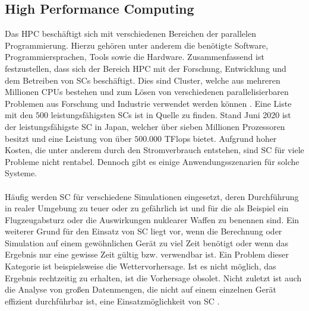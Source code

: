 \subsection{High Performance Computing}
Das \ac{HPC} beschäftigt sich mit verschiedenen Bereichen der parallelen Programmierung. Hierzu gehören unter anderem die benötigte Software, Programmiersprachen, Tools sowie die Hardware. Zusammenfassend ist festzustellen, dass sich der Bereich \ac{HPC} mit der Forschung, Entwicklung und dem Betreiben von \acp{SC} beschäftigt. Dies sind Cluster, welche aus mehreren Millionen \acp{CPU} bestehen und zum Lösen von verschiedenen parallelisierbaren Problemen aus Forschung und Industrie verwendet werden können \cite{nielsen2016introduction}. Eine Liste mit den $500$ leistungsfähigsten \acp{SC} ist in Quelle \cite{top500} zu finden. Stand Juni 2020 ist der leistungsfähigste \ac{SC} in Japan, welcher über sieben Millionen Prozessoren besitzt und eine Leistung von über $500.000$ TFlops bietet. Aufgrund hoher Kosten, die unter anderem durch den Stromverbrauch entstehen, sind \ac{SC} für viele Probleme nicht rentabel. Dennoch gibt es einige Anwendungsszenarien für solche Systeme.
\\\\
Häufig werden \ac{SC} für verschiedene Simulationen eingesetzt, deren Durchführung in realer Umgebung zu teuer oder zu gefährlich ist und für die als Beispiel ein Flugzeugabsturz oder die Auswirkungen nuklearer Waffen zu benennen sind. Ein weiterer Grund für den Einsatz von SC liegt vor, wenn die Berechnung oder Simulation auf einem gewöhnlichen Gerät zu viel Zeit benötigt oder wenn das Ergebnis nur eine gewisse Zeit gültig bzw. verwendbar ist. Ein Problem dieser Kategorie ist beispielsweise die Wettervorhersage. Ist es nicht möglich, das Ergebnis rechtzeitig zu erhalten, ist die Vorhersage obsolet. Nicht zuletzt ist auch die Analyse von großen Datenmengen, die nicht auf einem einzelnen Gerät effizient durchführbar ist, eine Einsatzmöglichkeit von \ac{SC} \cite{nielsen2016introduction}.


